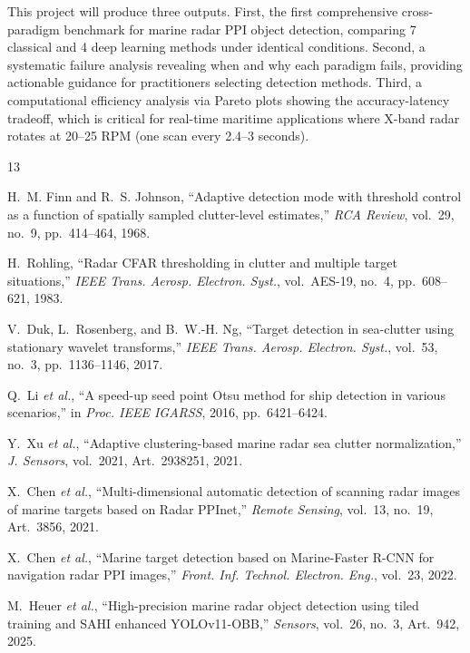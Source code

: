 \documentclass[conference]{IEEEtran}
\begin{document}
This project will produce three outputs. First, the first comprehensive cross-paradigm benchmark for marine radar PPI object detection, comparing 7 classical and 4 deep learning methods under identical conditions. Second, a systematic failure analysis revealing when and why each paradigm fails, providing actionable guidance for practitioners selecting detection methods. Third, a computational efficiency analysis via Pareto plots showing the accuracy-latency tradeoff, which is critical for real-time maritime applications where X-band radar rotates at 20--25 RPM (one scan every 2.4--3 seconds).


\begin{thebibliography}{13}

 H.~M. Finn and R.~S. Johnson, ``Adaptive detection mode with threshold control as a function of spatially sampled clutter-level estimates,'' \textit{RCA Review}, vol.~29, no.~9, pp.~414--464, 1968.

 H.~Rohling, ``Radar CFAR thresholding in clutter and multiple target situations,'' \textit{IEEE Trans. Aerosp. Electron. Syst.}, vol.~AES-19, no.~4, pp.~608--621, 1983.

 V.~Duk, L.~Rosenberg, and B.~W.-H. Ng, ``Target detection in sea-clutter using stationary wavelet transforms,'' \textit{IEEE Trans. Aerosp. Electron. Syst.}, vol.~53, no.~3, pp.~1136--1146, 2017.

 Q.~Li \textit{et al.}, ``A speed-up seed point Otsu method for ship detection in various scenarios,'' in \textit{Proc. IEEE IGARSS}, 2016, pp.~6421--6424.

 Y.~Xu \textit{et al.}, ``Adaptive clustering-based marine radar sea clutter normalization,'' \textit{J. Sensors}, vol.~2021, Art.~2938251, 2021.

 X.~Chen \textit{et al.}, ``Multi-dimensional automatic detection of scanning radar images of marine targets based on Radar PPInet,'' \textit{Remote Sensing}, vol.~13, no.~19, Art.~3856, 2021.

 X.~Chen \textit{et al.}, ``Marine target detection based on Marine-Faster R-CNN for navigation radar PPI images,'' \textit{Front. Inf. Technol. Electron. Eng.}, vol.~23, 2022.

 M.~Heuer \textit{et al.}, ``High-precision marine radar object detection using tiled training and SAHI enhanced YOLOv11-OBB,'' \textit{Sensors}, vol.~26, no.~3, Art.~942, 2025.


\end{thebibliography}
\end{document}
